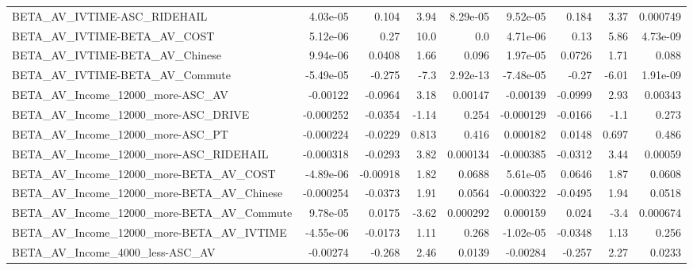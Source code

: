 \begin{tabular}{lrrrrrrrr}
BETA\_AV\_IVTIME-ASC\_RIDEHAIL                        &    4.03e-05 &        0.104 &      3.94 & 8.29e-05 &   9.52e-05 &       0.184 &         3.37 &      0.000749 \\
BETA\_AV\_IVTIME-BETA\_AV\_COST                        &    5.12e-06 &         0.27 &      10.0 &      0.0 &   4.71e-06 &        0.13 &         5.86 &      4.73e-09 \\
BETA\_AV\_IVTIME-BETA\_AV\_Chinese                     &    9.94e-06 &       0.0408 &      1.66 &    0.096 &   1.97e-05 &      0.0726 &         1.71 &         0.088 \\
BETA\_AV\_IVTIME-BETA\_AV\_Commute                     &   -5.49e-05 &       -0.275 &      -7.3 & 2.92e-13 &  -7.48e-05 &       -0.27 &        -6.01 &      1.91e-09 \\
BETA\_AV\_Income\_12000\_more-ASC\_AV                   &    -0.00122 &      -0.0964 &      3.18 &  0.00147 &   -0.00139 &     -0.0999 &         2.93 &       0.00343 \\
BETA\_AV\_Income\_12000\_more-ASC\_DRIVE                &   -0.000252 &      -0.0354 &     -1.14 &    0.254 &  -0.000129 &     -0.0166 &         -1.1 &         0.273 \\
BETA\_AV\_Income\_12000\_more-ASC\_PT                   &   -0.000224 &      -0.0229 &     0.813 &    0.416 &   0.000182 &      0.0148 &        0.697 &         0.486 \\
BETA\_AV\_Income\_12000\_more-ASC\_RIDEHAIL             &   -0.000318 &      -0.0293 &      3.82 & 0.000134 &  -0.000385 &     -0.0312 &         3.44 &       0.00059 \\
BETA\_AV\_Income\_12000\_more-BETA\_AV\_COST             &   -4.89e-06 &     -0.00918 &      1.82 &   0.0688 &   5.61e-05 &      0.0646 &         1.87 &        0.0608 \\
BETA\_AV\_Income\_12000\_more-BETA\_AV\_Chinese          &   -0.000254 &      -0.0373 &      1.91 &   0.0564 &  -0.000322 &     -0.0495 &         1.94 &        0.0518 \\
BETA\_AV\_Income\_12000\_more-BETA\_AV\_Commute          &    9.78e-05 &       0.0175 &     -3.62 & 0.000292 &   0.000159 &       0.024 &         -3.4 &      0.000674 \\
BETA\_AV\_Income\_12000\_more-BETA\_AV\_IVTIME           &   -4.55e-06 &      -0.0173 &      1.11 &    0.268 &  -1.02e-05 &     -0.0348 &         1.13 &         0.256 \\
BETA\_AV\_Income\_4000\_less-ASC\_AV                    &    -0.00274 &       -0.268 &      2.46 &   0.0139 &   -0.00284 &      -0.257 &         2.27 &        0.0233 \\

\end{tabular}
